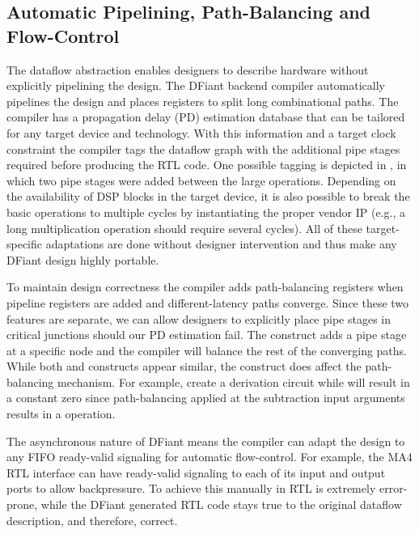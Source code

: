 \subsection{Automatic Pipelining, Path-Balancing and Flow-Control}

The dataflow abstraction enables designers to describe hardware without explicitly pipelining the design. The DFiant backend compiler automatically pipelines the design and places registers to split long combinational paths. The compiler has a propagation delay (PD) estimation database that can be tailored for any target device and technology. With this information and a target clock constraint the compiler tags the dataflow graph with the additional pipe stages required before producing the RTL code. One possible tagging is depicted in , in which two pipe stages were added between the large operations. Depending on the availability of DSP blocks in the target device, it is also possible to break the basic operations to multiple cycles by instantiating the proper vendor IP (e.g., a long multiplication operation should require several cycles). All of these target-specific adaptations are done without designer intervention and thus make any DFiant design highly portable.

To maintain design correctness the compiler adds path-balancing registers when pipeline registers are added and different-latency paths converge. Since these two features are separate, we can allow designers to explicitly place pipe stages in critical junctions should our PD estimation fail. The  construct adds a pipe stage at a specific node and the compiler will balance the rest of the converging paths. While both  and  constructs appear similar, the  construct does affect the path-balancing mechanism. For example,  create a derivation circuit while  will result in a constant zero since path-balancing applied at the subtraction input arguments results in a  operation.

The asynchronous nature of DFiant means the compiler can adapt the design to any FIFO ready-valid signaling for automatic flow-control. For example, the MA4 RTL interface can have ready-valid signaling to each of its input and output ports to allow backpressure. To achieve this manually in RTL is extremely error-prone, while the DFiant generated RTL code stays true to the original dataflow description, and therefore, correct.

